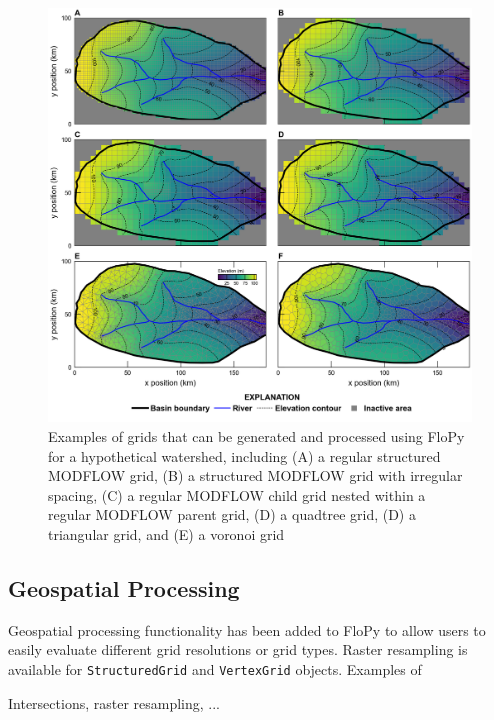 \documentclass[11pt, oneside]{article}   	%
\begin{document}
\begin{figure}[ht!]
	\begin{center}
		\includegraphics{figures/grids_geoprocessing.png}
	\end{center}
	\caption{Examples of grids that can be generated and processed using FloPy for a hypothetical watershed, including (A) a regular structured MODFLOW grid, (B) a structured MODFLOW grid with irregular spacing, (C) a regular MODFLOW child grid nested within a regular MODFLOW parent grid, (D) a quadtree grid, (D) a triangular grid, and (E) a voronoi grid}\label{fig:grids}
\end{figure}

\subsection{Geospatial Processing}

Geospatial processing functionality has been added to FloPy to allow users to easily evaluate different grid resolutions or grid types. Raster resampling is available for \texttt{StructuredGrid} and \texttt{VertexGrid} objects. Examples of   

Intersections, raster resampling, ...

\lipsum[102-108]
\end{document}
